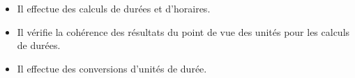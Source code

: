 \begin{prerequis}[Objectifs de 5\up{e}]  
    \begin{itemize}  
        \item Il effectue des calculs de durées et d'horaires.
        \item Il vérifie la cohérence des résultats du point de vue des unités pour les calculs de durées.
        \columnbreak
        \item Il effectue des conversions d'unités de durée.
    \end{itemize}
\end{prerequis}
